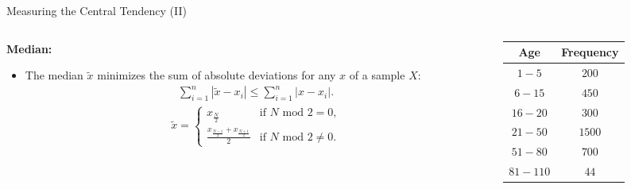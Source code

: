 \begin{frame}{Measuring the Central Tendency (II)}
  \begin{columns}
    \begin{column}{0.6\textwidth}
      \textbf{Median:}
      \begin{itemize}[noitemsep]
      \item The median $\tilde{x}$ minimizes the sum of absolute deviations for any $x$ of a sample $X$:
        \begin{align}
          \sum_{i=1}^{n} |\tilde{x}-x_i| \leq \sum_{i=1}^{n} |x-x_i|.
        \end{align}
        \begin{align}
          \tilde{x} = \begin{cases}
            x_{\frac{N}{2}} & \text{if $N$ mod $2 = 0$,} \\
            \frac{x_{\frac{N-1}{2}}+x_{\frac{N+1}{2}}}{2} & \text{if $N$ mod $2 \neq 0$.}
          \end{cases}
        \end{align}
      \end{itemize}
    \end{column}
    \begin{column}{0.3\textwidth}  %
      \begin{table}
        \begin{tabular}{|c|c|}
          Age & Frequency \\ \hline
          $1-5$ & $200$ \\
          $6-15$ & $450$ \\
          $16-20$ & $300$ \\
          $21-50$ & $1500$ \\
          $51-80$ & $700$ \\
          $81-110$ & $44$
        \end{tabular}\\[0.5cm]
      \end{table}
    \end{column}
  \end{columns}
\end{frame}

